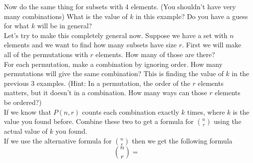 \documentclass[14,fleqn]{article}
\begin{document}
Now do the same thing for subsets with 4 elements. (You shouldn't have very many combinations) What is the value of $k$ in this example? Do you have a guess for what $k$ will be in general?\\[.4 in]

Let's try to make this completely general now. Suppose we have a set with $n$ elements and we want to find how many subsets have size $r.$ First we will make all of the permutations with $r$ elements. How many of those are there?\\[.5 in]

For each permutation, make a combination by ignoring order. How many permutations will give the same combination? This is finding the value of $k$ in the previous 3 examples. (Hint: In a permutation, the order of the $r$ elements matters, but it doesn't in a combination. How many ways can those $r$ elements be ordered?)\\[1 in]

If we know that $P(n,r)$ counts each combination exactly $k$ times, where $k$ is the value you found before. Combine these two to get a formula for $\binom{n}{r}$ using the actual value of $k$ you found.\\[.3 in]

If we use the alternative formula for $\binom{n}{r}$ then we get the following formula
\[
	\binom{n}{r}=
\]
\end{document}
